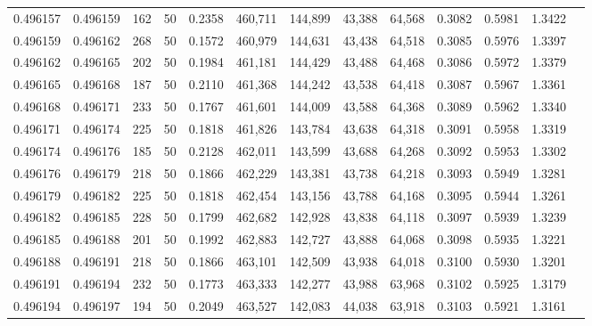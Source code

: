 \begin{tabular}{rrrrrrrrrrrrr}
0.496157 & 0.496159 &   162 &  50 &                                     0.2358 & 460,711 & 144,899 &  43,388 &  64,568 & 0.3082 & 0.5981 & 1.3422 \\
0.496159 & 0.496162 &   268 &  50 &                                     0.1572 & 460,979 & 144,631 &  43,438 &  64,518 & 0.3085 & 0.5976 & 1.3397 \\
0.496162 & 0.496165 &   202 &  50 &                                     0.1984 & 461,181 & 144,429 &  43,488 &  64,468 & 0.3086 & 0.5972 & 1.3379 \\
0.496165 & 0.496168 &   187 &  50 &                                     0.2110 & 461,368 & 144,242 &  43,538 &  64,418 & 0.3087 & 0.5967 & 1.3361 \\
0.496168 & 0.496171 &   233 &  50 &                                     0.1767 & 461,601 & 144,009 &  43,588 &  64,368 & 0.3089 & 0.5962 & 1.3340 \\
0.496171 & 0.496174 &   225 &  50 &                                     0.1818 & 461,826 & 143,784 &  43,638 &  64,318 & 0.3091 & 0.5958 & 1.3319 \\
0.496174 & 0.496176 &   185 &  50 &                                     0.2128 & 462,011 & 143,599 &  43,688 &  64,268 & 0.3092 & 0.5953 & 1.3302 \\
0.496176 & 0.496179 &   218 &  50 &                                     0.1866 & 462,229 & 143,381 &  43,738 &  64,218 & 0.3093 & 0.5949 & 1.3281 \\
0.496179 & 0.496182 &   225 &  50 &                                     0.1818 & 462,454 & 143,156 &  43,788 &  64,168 & 0.3095 & 0.5944 & 1.3261 \\
0.496182 & 0.496185 &   228 &  50 &                                     0.1799 & 462,682 & 142,928 &  43,838 &  64,118 & 0.3097 & 0.5939 & 1.3239 \\
0.496185 & 0.496188 &   201 &  50 &                                     0.1992 & 462,883 & 142,727 &  43,888 &  64,068 & 0.3098 & 0.5935 & 1.3221 \\
0.496188 & 0.496191 &   218 &  50 &                                     0.1866 & 463,101 & 142,509 &  43,938 &  64,018 & 0.3100 & 0.5930 & 1.3201 \\
0.496191 & 0.496194 &   232 &  50 &                                     0.1773 & 463,333 & 142,277 &  43,988 &  63,968 & 0.3102 & 0.5925 & 1.3179 \\
0.496194 & 0.496197 &   194 &  50 &                                     0.2049 & 463,527 & 142,083 &  44,038 &  63,918 & 0.3103 & 0.5921 & 1.3161 \\

\end{tabular}
